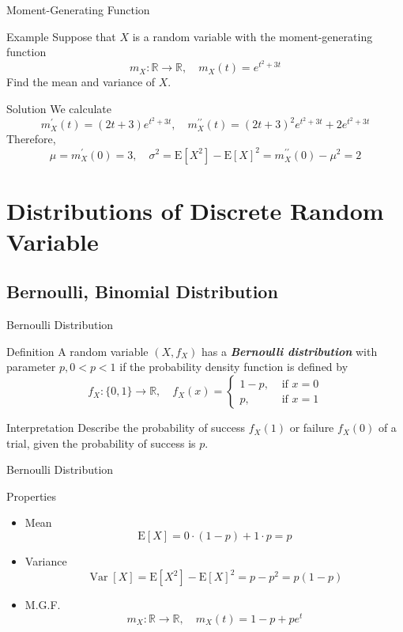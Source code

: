 \documentclass{beamer}
\newcommand{\bb}[1]{\textcolor{antiquefuchsia}{\textbf{\textit{#1}}}}
\begin{document}
\begin{frame}{Moment-Generating Function}
\begin{block}{Example}
Suppose that $X$ is a random variable with the moment-generating function
$$
m_{X}: \mathbb{R} \rightarrow \mathbb{R}, \quad m_{X}(t)=e^{t^{2}+3 t}
$$
Find the mean and variance of $X$.
\end{block}
\pause
\begin{block}{Solution}
We calculate
$$
m_{X}^{\prime}(t)=(2 t+3) e^{t^{2}+3 t}, \quad m_{X}^{\prime \prime}(t)=(2 t+3)^{2} e^{t^{2}+3 t}+2 e^{t^{2}+3 t}
$$
Therefore,
$$
\mu=m_{X}^{\prime}(0)=3, \quad \sigma^{2}=\mathrm{E}\left[X^{2}\right]-\mathrm{E}[X]^{2}=m_{X}^{\prime \prime}(0)-\mu^{2}=2
$$
\end{block}
\end{frame}

\section{Distributions of Discrete Random Variable}
\subsection{Bernoulli, Binomial Distribution}

\begin{frame}{Bernoulli Distribution}
\begin{block}{Definition}
A random variable $\left(X, f_{X}\right)$ has a \bb{Bernoulli distribution} with parameter $p, 0<p<1$ if the probability density function is defined by
$$
f_{X}:\{0,1\} \rightarrow \mathbb{R}, \quad f_{X}(x)= \begin{cases}1-p, & \text { if } x=0 \\ p, & \text { if } x=1\end{cases}
$$
\end{block}
\begin{block}{Interpretation}
Describe the probability of success $f_{X}(1)$ or failure $f_{X}(0)$ of a trial, given the probability of success is $p$.
\end{block}
\end{frame}

\begin{frame}{Bernoulli Distribution}
\begin{block}{Properties}
\begin{itemize}
\item Mean
$$
\mathrm{E}[X]=0 \cdot(1-p)+1 \cdot p=p
$$
\item Variance
$$
\operatorname{Var}[X]=\mathrm{E}\left[X^{2}\right]-\mathrm{E}[X]^{2}=p-p^{2}=p(1-p)
$$
\item M.G.F.
$$
m_{X}: \mathbb{R} \rightarrow \mathbb{R}, \quad m_{X}(t)=1-p+pe^{t} 
$$
\end{itemize}
\end{block}
\end{frame}
\end{document}
